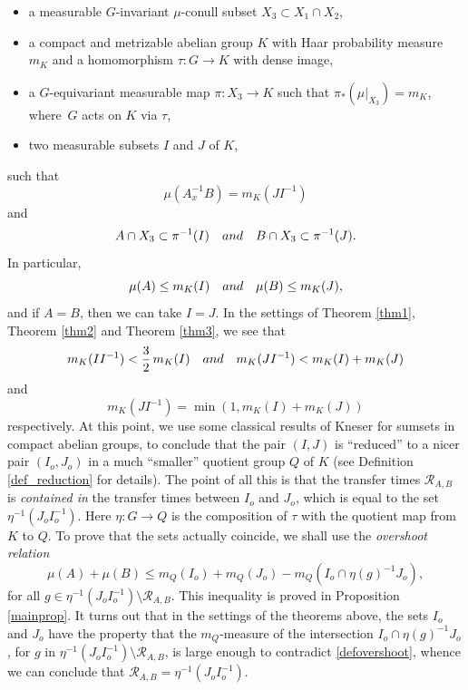 \documentclass[11pt]{article}
\numberwithin{equation}{section}
\let\mathcal\mathscr
\newcommand{\cR}{\mathcal{R}}
\newcommand{\qand}{\quad\textup{and}\quad}
\theoremstyle{plain}
\theoremstyle{definition}
\begin{document}
\begin{itemize}
\item a measurable $G$-invariant $\mu$-conull subset $X_3 \subset X_1 \cap X_2$,

\item a compact and metrizable abelian group $K$ with Haar probability measure $m_K$ and
a homomorphism $\tau : G \to K$ with dense image,

\item a $G$-equivariant measurable map $\pi : X_3 \to K$ such that $\pi_*(\mu |_{X_3}) = m_K$, where~$G$ acts on $K$ via $\tau$,

\item two measurable subsets $I$ and $J$ of $K$,
\end{itemize}
such that
\[
\mu(A_x^{-1}B) = m_K(JI^{-1})
\]
and
\[
A \cap X_3 \subset \pi^{-1}(I) \qand B \cap X_3 \subset \pi^{-1}(J).
\]
In particular,
\[
\mu(A) \leq m_K(I) \qand \mu(B) \leq m_K(J),
\]
and if $A = B$, then we can take $I = J$. In the settings of Theorem \ref{thm1}, Theorem \ref{thm2} and Theorem \ref{thm3}, we see that
\[
m_K(I I^{-1}) < \frac{3}{2}\, m_K(I)
\qand
m_K(JI^{-1}) < m_K(I) + m_K(J)
\]
and
\[
m_K(J I^{-1}) = \min(1,m_K(I) + m_K(J))
\]
respectively. At this point, we use some classical results \cite{Kneser} of Kneser for sumsets in compact abelian groups,
to conclude that the pair $(I,J)$ is ``reduced'' to a nicer pair $(I_o,J_o)$ in a much ``smaller'' quotient group $Q$ of $K$ (see
Definition \ref{def_reduction} for details). The point of all this is that the transfer times $\cR_{A,B}$ is \emph{contained in} the
transfer times between $I_o$ and $J_o$, which is equal to the set $\eta^{-1}(J_oI_o^{-1})$. Here $\eta : G \to Q$ is the composition
of $\tau$ with the quotient map from $K$ to $Q$. To prove that the sets actually coincide,
we shall use the \emph{overshoot relation}
\begin{equation}
\label{defovershoot}
\mu(A) + \mu(B) \leq m_Q(I_o) + m_Q(J_o) - m_Q(I_o \cap \eta(g)^{-1}J_o),
\end{equation}
for all $g \in \eta^{-1}(J_o I_o^{-1}) \setminus \cR_{A,B}$. This inequality is proved in Proposition \ref{mainprop}. It turns out that in
the settings of the theorems above, the sets $I_o$ and $J_o$ have the property that the $m_Q$-measure of the
intersection $I_o \cap \eta(g)^{-1}J_o$, for $g$ in $\eta^{-1}(J_o I_o^{-1}) \setminus \cR_{A,B}$, is large enough to
contradict \eqref{defovershoot}, whence we can conclude that $\cR_{A,B} = \eta^{-1}(J_o I_o^{-1})$.
\end{document}
